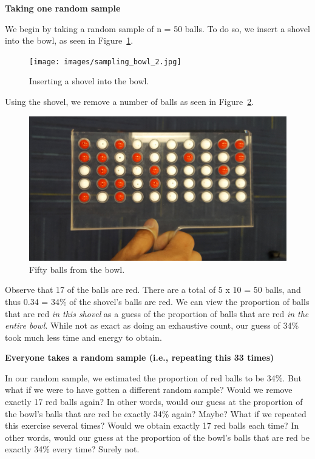 \documentclass[
  letterpaper,
  DIV=11,
  numbers=noendperiod]{scrreprt}
\theoremstyle{definition}
\theoremstyle{remark}
\begin{document}
\textbf{Taking one random sample}

We begin by taking a random sample of n = 50 balls. To do so, we insert
a shovel into the bowl, as seen in Figure~\ref{fig-sampling-exercise-2}.

\begin{figure}

{\centering \texttt{[image: images/sampling\_bowl\_2.jpg]}

}

\caption{\label{fig-sampling-exercise-2}Inserting a shovel into the
bowl.}

\end{figure}

Using the shovel, we remove a number of balls as seen in
Figure~\ref{fig-sampling-exercise-3}.

\begin{figure}

{\centering \includegraphics{images/sampling_bowl_3_cropped.jpg}

}

\caption{\label{fig-sampling-exercise-3}Fifty balls from the bowl.}

\end{figure}

Observe that 17 of the balls are red. There are a total of 5 x 10 = 50
balls, and thus 0.34 = 34\% of the shovel's balls are red. We can view
the proportion of balls that are red \emph{in this shovel} as a guess of
the proportion of balls that are red \emph{in the entire bowl}. While
not as exact as doing an exhaustive count, our guess of 34\% took much
less time and energy to obtain.

\textbf{Everyone takes a random sample (i.e., repeating this 33 times)}

In our random sample, we estimated the proportion of red balls to be
34\%. But what if we were to have gotten a different random sample?
Would we remove exactly 17 red balls again? In other words, would our
guess at the proportion of the bowl's balls that are red be exactly 34\%
again? Maybe? What if we repeated this exercise several times? Would we
obtain exactly 17 red balls each time? In other words, would our guess
at the proportion of the bowl's balls that are red be exactly 34\% every
time? Surely not.
\end{document}
